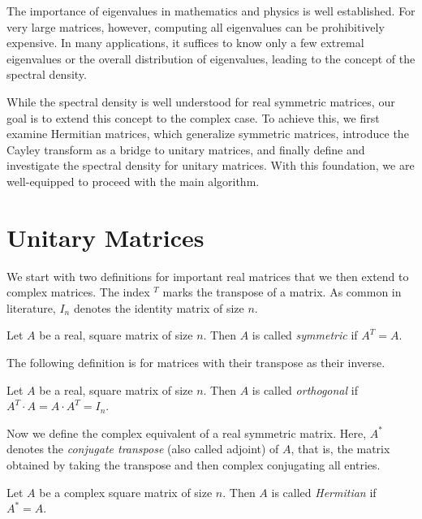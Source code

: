 The importance of eigenvalues in mathematics and physics is well established. For very large matrices, however, computing all eigenvalues can be prohibitively expensive. In many applications, it suffices to know only a few extremal eigenvalues or the overall distribution of eigenvalues, leading to the concept of the spectral density.

While the spectral density is well understood for real symmetric matrices, our goal is to extend this concept to the complex case. To achieve this, we first examine Hermitian matrices, which generalize symmetric matrices, introduce the Cayley transform as a bridge to unitary matrices, and finally define and investigate the spectral density for unitary matrices. With this foundation, we are well-equipped to proceed with the main algorithm.

\section{Unitary Matrices}

We start with two definitions for important real matrices that we then extend to complex matrices. The index $^T$ marks the transpose of a matrix. As common in literature, $I_n$ denotes the identity matrix of size $n$.

\begin{definition}
    Let $A$ be a real, square matrix of size $n$.
    Then $A$ is called \emph{symmetric} if $A^T = A$.
\end{definition}

The following definition is for matrices with their transpose as their inverse.

\begin{definition}
    Let $A$ be a real, square matrix of size $n$.
    Then $A$ is called \emph{orthogonal} if $A^T \cdot A = A \cdot A^T = I_n$.
\end{definition}

Now we define the complex equivalent of a real symmetric matrix. Here, $A^*$ denotes the \emph{conjugate transpose} (also called adjoint) of $A$, that is, the matrix obtained by taking the transpose and then complex conjugating all entries.

\begin{definition}
    Let $A$ be a complex square matrix of size $n$.
    Then $A$ is called \emph{Hermitian} if $A^* = A$.
\end{definition}

